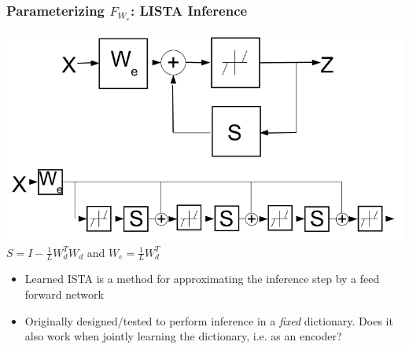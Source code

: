 \documentclass{beamer}
\begin{document}
\begin{frame}
\frametitle{Parameterizing $F_{W_e}$: LISTA Inference}  
\begin{center} 
\includegraphics[scale = 0.3]{./images/LISTA/LISTA.png} \\
$S = I - \frac{1}{L} W_d ^T W_d$ and $W_e = \frac{1}{L} W_d ^T$
\end{center} 
\begin{itemize}
\item{Learned ISTA is a method for approximating the inference step by a feed forward network} 
\item{Originally designed/tested to perform inference in a \emph{fixed} dictionary. Does it also work when jointly learning the dictionary, i.e. as an encoder?} 
\end{itemize} 
\end{frame} 
\end{document}

